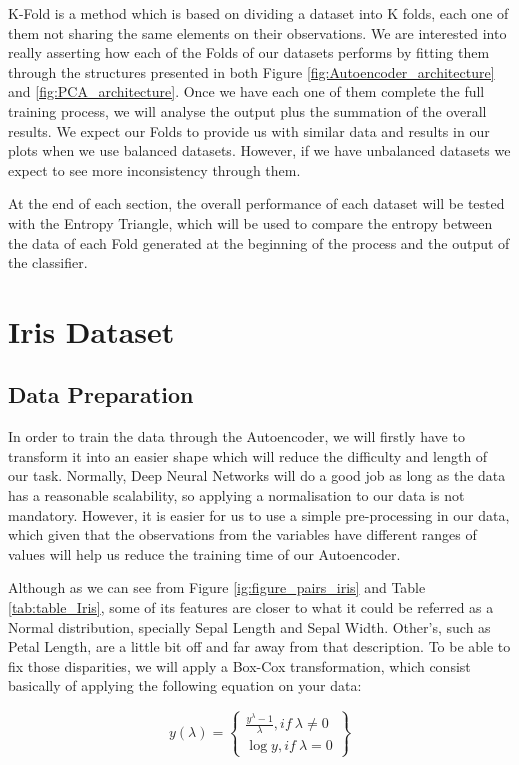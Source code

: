 K-Fold is a method which is based on dividing a dataset into K folds, each one of them not sharing the same elements on their observations. We are interested into really asserting how each of the Folds of our datasets performs by fitting them through the structures presented in both Figure \ref{fig:Autoencoder_architecture} and \ref{fig:PCA_architecture}. Once we have each one of them complete the full training process, we will analyse the output plus the summation of the overall results. We expect our Folds to provide us with similar data and results in our plots when we use balanced datasets. However, if we have unbalanced datasets we expect to see more inconsistency through them.\par

At the end of each section, the overall performance of each dataset will be tested with the Entropy Triangle, which will be used to compare the entropy between the data of each Fold generated at the beginning of the process and the output of the classifier.

\section{Iris Dataset}
\subsection{Data Preparation}

In order to train the data through the Autoencoder, we will firstly have to transform it into an easier shape which will reduce the difficulty and length of our task. Normally, Deep Neural Networks will do a good job as long as the data has a reasonable scalability, so applying a normalisation to our data is not mandatory. However, it is easier for us to use a simple pre-processing in our data, which given that the observations from the variables have different ranges of values will help us reduce the training time of our Autoencoder.

Although as we can see from Figure \ref{ig:figure_pairs_iris} and Table \ref{tab:table_Iris}, some of its features are closer to what it could be referred as a Normal distribution, specially Sepal Length and Sepal Width. Other's, such as Petal Length, are a little bit off and far away from that description. To be able to fix those disparities, we will apply a Box-Cox transformation, which consist basically of applying the following equation on your data:

\begin{equation}
\label{eq:box-cox}
 {y(\lambda)=} \left\{
 \begin{aligned}
        \frac{y^{\lambda} - 1}{\lambda} ,  if \  \lambda \neq 0\\
        {\log y}, if \ \lambda = 0
       \end{aligned}
 \right\}
 \end{equation} 
\newline

